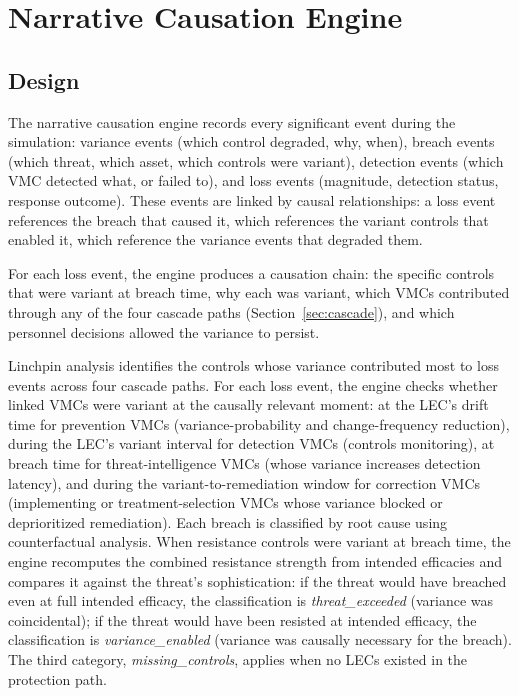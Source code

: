 \documentclass[11pt,a4paper]{article}
\begin{document}
\section{Narrative Causation Engine}

\subsection{Design}

The narrative causation engine records every significant event during the simulation: variance events (which control degraded, why, when), breach events (which threat, which asset, which controls were variant), detection events (which VMC detected what, or failed to), and loss events (magnitude, detection status, response outcome). These events are linked by causal relationships: a loss event references the breach that caused it, which references the variant controls that enabled it, which reference the variance events that degraded them.

For each loss event, the engine produces a causation chain: the specific controls that were variant at breach time, why each was variant, which VMCs contributed through any of the four cascade paths (Section~\ref{sec:cascade}), and which personnel decisions allowed the variance to persist.

Linchpin analysis identifies the controls whose variance contributed most to loss events across four cascade paths. For each loss event, the engine checks whether linked VMCs were variant at the causally relevant moment: at the LEC's drift time for prevention VMCs (variance-probability and change-frequency reduction), during the LEC's variant interval for detection VMCs (controls monitoring), at breach time for threat-intelligence VMCs (whose variance increases detection latency), and during the variant-to-remediation window for correction VMCs (implementing or treatment-selection VMCs whose variance blocked or deprioritized remediation). Each breach is classified by root cause using counterfactual analysis. When resistance controls were variant at breach time, the engine recomputes the combined resistance strength from intended efficacies and compares it against the threat's sophistication: if the threat would have breached even at full intended efficacy, the classification is \emph{threat\_exceeded} (variance was coincidental); if the threat would have been resisted at intended efficacy, the classification is \emph{variance\_enabled} (variance was causally necessary for the breach). The third category, \emph{missing\_controls}, applies when no LECs existed in the protection path.
\end{document}
